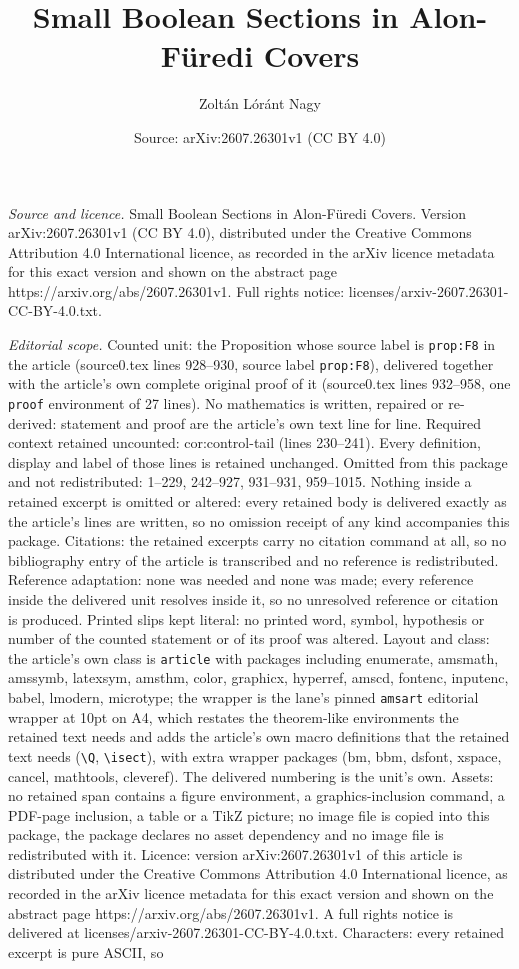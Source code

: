 \documentclass[10pt,a4paper]{amsart}
\title[Small Boolean Sections in Alon-F\"uredi Covers]{Small Boolean Sections in Alon-F\"uredi Covers}
\author{Zolt\'an L\'or\'ant Nagy}
\date{Source: arXiv:2607.26301v1 (CC BY 4.0)}
\begin{document}
\maketitle

\noindent\emph{Source and licence.} Small Boolean Sections in Alon-F\"uredi Covers. Version arXiv:2607.26301v1 (CC BY 4.0), distributed under the Creative Commons Attribution 4.0 International licence, as recorded in the arXiv licence metadata for this exact version and shown on the abstract page https://arxiv.org/abs/2607.26301v1. Full rights notice: licenses/arxiv-2607.26301-CC-BY-4.0.txt.\par\smallskip

\noindent\textit{Editorial scope.} Counted unit: the Proposition whose source label is \texttt{prop:F8} in the article (source0.tex lines 928--930, source label \texttt{prop:F8}), delivered together with the article's own complete original proof of it (source0.tex lines 932--958, one \texttt{proof} environment of 27 lines). No mathematics is written, repaired or re-derived: statement and proof are the article's own text line for line. Required context retained uncounted: cor:control-tail (lines 230--241). Every definition, display and label of those lines is retained unchanged. Omitted from this package and not redistributed: 1--229, 242--927, 931--931, 959--1015. Nothing inside a retained excerpt is omitted or altered: every retained body is delivered exactly as the article's lines are written, so no omission receipt of any kind accompanies this package. Citations: the retained excerpts carry no citation command at all, so no bibliography entry of the article is transcribed and no reference is redistributed. Reference adaptation: none was needed and none was made; every reference inside the delivered unit resolves inside it, so no unresolved reference or citation is produced. Printed slips kept literal: no printed word, symbol, hypothesis or number of the counted statement or of its proof was altered. Layout and class: the article's own class is \texttt{article} with packages including enumerate, amsmath, amssymb, latexsym, amsthm, color, graphicx, hyperref, amscd, fontenc, inputenc, babel, lmodern, microtype; the wrapper is the lane's pinned \texttt{amsart} editorial wrapper at 10pt on A4, which restates the theorem-like environments the retained text needs and adds the article's own macro definitions that the retained text needs (\texttt{\textbackslash Q}, \texttt{\textbackslash isect}), with extra wrapper packages (bm, bbm, dsfont, xspace, cancel, mathtools, cleveref). The delivered numbering is the unit's own. Assets: no retained span contains a figure environment, a graphics-inclusion command, a PDF-page inclusion, a table or a TikZ picture; no image file is copied into this package, the package declares no asset dependency and no image file is redistributed with it. Licence: version arXiv:2607.26301v1 of this article is distributed under the Creative Commons Attribution 4.0 International licence, as recorded in the arXiv licence metadata for this exact version and shown on the abstract page https://arxiv.org/abs/2607.26301v1. A full rights notice is delivered at licenses/arxiv-2607.26301-CC-BY-4.0.txt. Characters: every retained excerpt is pure ASCII, so 
\end{document}
